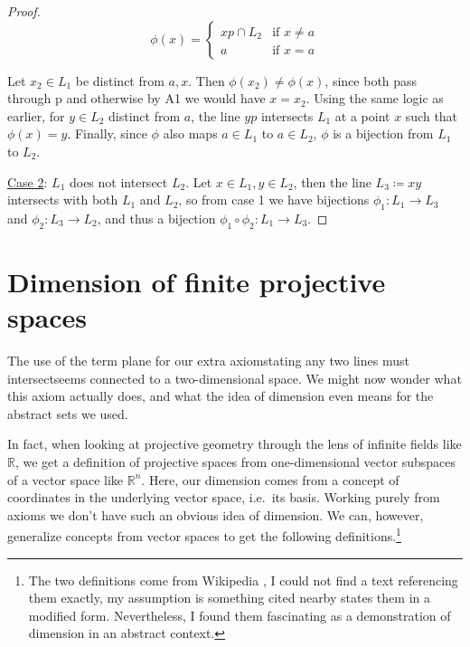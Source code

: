 \documentclass[12pt]{article}
\begin{document}
\begin{proof}
        \[
            \phi(x) =
            \begin{cases}
                xp \cap L_2 & \text{if } x \neq a \\
                a & \text{if } x = a
            \end{cases}
        \]

        Let $x_2\in L_1$ be distinct from $a, x$.
        Then $\phi(x_2) \neq \phi(x)$,
        since both pass through p and otherwise by A1 we would have $x = x_2$.
        Using the same logic as earlier, for $y \in L_2$ distinct from $a$, the line $yp$ intersects $L_1$ at a point $x$ such that $\phi(x)=y$.
        Finally, since $\phi$ also maps $a \in L_1$ to $a \in L_2$, $\phi$ is a bijection from $L_1$ to $L_2$.

        \underline{Case 2}: $L_1$ does not intersect $L_2$.
        Let $x \in L_1, y \in L_2$, then the line $L_3 \coloneqq xy$ intersects with both $L_1$ and $L_2$, so from case 1 we have bijections
        $\phi_1: L_1 \rightarrow L_3$ and $\phi_2: L_3 \rightarrow L_2$, and thus a bijection $\phi_1 \circ \phi_2: L_1 \rightarrow L_3$.
    \end{proof}


    \section{Dimension of finite projective spaces}

    The use of the term plane for our extra axiom\textemdash stating any two lines must intersect\textemdash seems connected to a two-dimensional space.
    We might now wonder what this axiom actually does, and what the idea of dimension even means for the abstract sets we used.

    In fact, when looking at projective geometry through the lens of infinite fields like $\mathbb{R}$,
    we get a definition of projective spaces from one-dimensional vector subspaces of a vector space like $\mathbb{R}^n$\cite{weisstein_projective_nodate}.
    Here, our dimension comes from a concept of coordinates in the underlying vector space, i.e.\ its basis.
    Working purely from axioms we don't have such an obvious idea of dimension.
    We can, however, generalize concepts from vector spaces to get the following definitions.\footnote{
        The two definitions come from Wikipedia \cite{noauthor_projective_2024},
        I could not find a text referencing them exactly, my assumption is something cited nearby states them in a modified form.
        Nevertheless, I found them fascinating as a demonstration of dimension in an abstract context.
    }
\end{document}
